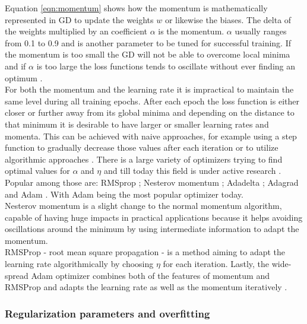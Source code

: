 Equation \ref{eqn:momentum} shows how the momentum is mathematically represented in GD to
update the weights $w$ or likewise the biases. The delta of the weights multiplied by an
coefficient $\alpha$ is the momentum. $\alpha$ usually ranges from 0.1 to 0.9 and is
another parameter to be tuned for successful training. If the momentum is too small the GD
will not be able to overcome local minima and if $\alpha$ is too large the loss functions tends to oscillate without ever finding an optimum \cite{lecun2015deep}. \\
For both the momentum and the learning rate it is impractical to maintain the same level
during all training epochs. After each epoch the loss function is either closer or further
away from its global minima and depending on the distance to that minimum it is desirable
to have larger or smaller learning rates and momenta. This can be achieved with naive
approaches, for example using a step function to gradually decrease those values after
each iteration or to utilize algorithmic approaches \cite{michie1994machine}. There is a
large variety of optimizers trying to find optimal values for $\alpha$ and $\eta$ and till
today this field is under active research \cite{goodfellow2016deep}. Popular among those
are: RMSprop \cite{hinton2012neural}; Nesterov momentum \cite{dozat2016incorporating};
Adadelta \cite{zeiler2012adadelta}; Adagrad \cite{ruder2016overview} and Adam
\cite{kingma2014adam}. With Adam being the most popular
optimizer today. \\
Nesterov momentum is a slight change to the normal momentum algorithm, capable of having huge impacts in practical applications because it helps avoiding oscillations around the minimum by using intermediate information to adapt the momentum. \\
RMSProp - root mean square propagation - is a method aiming to adapt the learning rate
algorithmically by choosing $\eta$ for each iteration. Lastly, the wide-spread Adam
optimizer combines both of the features of momentum and RMSProp and adapts the learning
rate as well as the momentum iteratively \cite{kingma2014adam}.

\subsubsection{Regularization parameters and overfitting}

